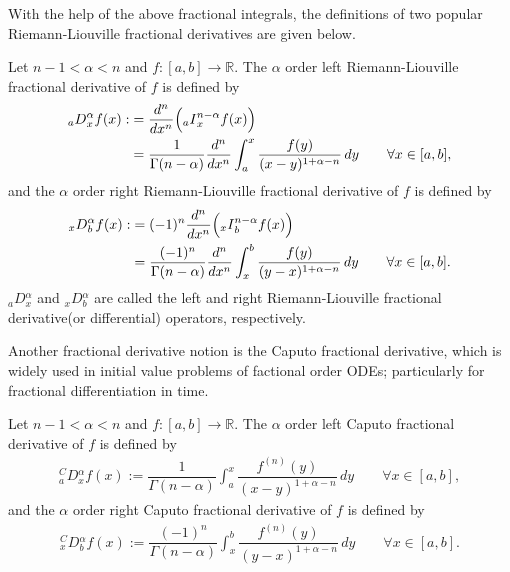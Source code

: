 \documentclass[leqno,final]{siamltex}
\numberwithin{equation}{section}
\renewcommand{\(}{\bigl(}
\renewcommand{\)}{\bigr)}
\newcommand{\R}{\mathbb{R}}
\begin{document}
            With the help of the above fractional integrals,  the definitions of two popular Riemann-Liouville fractional derivatives are given below.  

            \begin{definition} \label{def2.2} 
                Let $n-1 < \alpha < n$ and $f : [a,b] \rightarrow \R$. The  $\alpha$ order left Riemann-Liouville fractional derivative of $f$ is defined by
                \begin{align}\label{left_RL_derivative}
                    {_{a}}{{D}}{_{x}^{\alpha}} f(x):&= \dfrac{d^{n}}{dx^n} \Bigl( {_{a}}{I}{^{n-\alpha}_{x}}f(x) \Bigr) \\
                    &=\dfrac{1}{\Gamma(n - \alpha)} \dfrac{d^{n}}{dx^n}\int_{a}^{x} \dfrac{f(y)}{(x - y)^{1  + \alpha -n} } \, dy    \qquad \forall x\in [a,b],\nonumber
                \end{align} 
                and the  $\alpha$ order right Riemann-Liouville fractional derivative of $f$ is defined by
                \begin{align}\label{right_RL_derivative}
                    {_{x}}{{D}}{^{\alpha}_{b}}f(x) :&= (-1)^n  \dfrac{d^n}{dx^n} \Bigl({_{x}}{I}{^{n-\alpha}_{b}} f(x) \Bigr)  \\
                    &= \dfrac{(-1)^n}{\Gamma(n - \alpha)} \dfrac{d^n}{dx^n} \int_{x}^{b}  \dfrac{f(y)}{(y - x)^{1 + \alpha -n} }  \,dy     \qquad \forall x\in [a,b].
                    \nonumber
                \end{align}
                ${_{a}}{{D}}{_{x}^{\alpha}} $ and ${_{x}}{{D}}{^{\alpha}_{b}}$ are called the left and right Riemann-Liouville fractional derivative(or differential) operators, respectively. 
            \end{definition}
    
            Another fractional derivative notion is the Caputo fractional derivative, which is widely used in initial value problems of factional order ODEs; particularly for fractional differentiation in time.
 
            \begin{definition} \label{def2.3}
                Let $n-1 < \alpha <n$ and $f :[a,b] \rightarrow \R$.  The $\alpha$ order left Caputo fractional derivative of $f$ is defined by
                \begin{align}\label{left_Caputo}
                    {^{C}_{a}}{{D}}{_{x}^{\alpha}} f(x) := \dfrac{1}{\Gamma(n- \alpha)} \int_{a}^{x} \dfrac{f^{(n)}(y)}{(x- y)^{ 1+ \alpha -n}} \,dy \qquad \forall x\in [a,b],
                \end{align}
                and the $\alpha$ order right Caputo fractional derivative of $f$ is defined by
                \begin{align}\label{right_Caputo}
                    {^{C}_{x}}{{D}}{_{b}^{\alpha}} f(x) := \dfrac{(-1)^n}{\Gamma(n - \alpha)}  \int_{x}^{b} \dfrac{f^{(n)}(y)}{(y - x)^{1+\alpha -n}} \, dy \qquad\forall x\in [a,b].
                \end{align}
            \end{definition}
\end{document}
